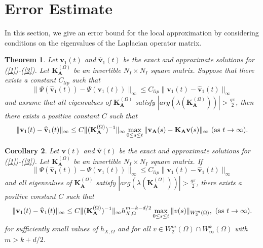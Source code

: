 \documentclass[9pt]{article}
\newtheorem{theorem}{Theorem}[section]
\newtheorem{corollary}[theorem]{Corollary}
\numberwithin{equation}{section}
\begin{document}
\section{Error Estimate}\label{Sec3}
In this section, we give an error
bound  for the local approximation by considering conditions
on the eigenvalues of the Laplacian operator matrix.
\begin{theorem}\label{uyo0}
Let $\textbf{v}_1(t)$ and $\widehat{\textbf{v}}_1(t)$ be the exact and approximate solutions for (\ref{1})-(\ref{3}). Let $\textbf{K}^{(\Omega)}_{\mathbf{A}}$ be an invertible $N_{I}\times N_{I}$ square matrix. Suppose that there exists a constant $C_{lip}$ such that \[\|\Psi(\widehat{\textbf{v}}_1(t))-\Psi(\textbf{v}_1(t))\|_{\infty}\leq C_{lip} \|\textbf{v}_{1}(t)-\widehat{\textbf{v}}_1(t)\|_{\infty}\]
 and assume that all eigenvalues of $\textbf{K}^{(\Omega)}_{\mathbf{A}}$ satisfy
$|arg(\lambda(\textbf{K}^{(\Omega)}_{\mathbf{A}}))|>\frac{q \pi}{2}$,
 then there exists a positive constant $C$ such that
\begin{eqnarray}\label{ret11}
\|\textbf{v}_{1}(t)-\widehat{\textbf{v}}_1(t)\|_{\infty}\leq C  \|(\textbf{K}^{(\Omega)}_{\mathbf{A}})^{-1}\|_{\infty}\max_{0\leq s \leq t} \|\textbf{v}_{\mathbf{A}}(s)-\textbf{K}_{\mathbf{A}}\textbf{v}(s)\|_{\infty}~(\hbox{as} ~t \rightarrow \infty).
\end{eqnarray}
\end{theorem}
\begin{corollary}
Let $\textbf{v}(t)$ and $\widehat{\textbf{v}}(t)$ be the exact and approximate solutions for (\ref{1})-(\ref{3}). Let $\textbf{K}^{(\Omega)}_{\mathbf{A}}$ be an invertible $N_{I}\times N_{I}$ square matrix. If \[\|\Psi(\widehat{\textbf{v}}_1(t))-\Psi(\textbf{v}_1(t))\|_{\infty}\leq C_{lip} \|\textbf{v}_{1}(t)-\widehat{\textbf{v}}_1(t)\|_{\infty}\]
 and all eigenvalues of $\textbf{K}^{(\Omega)}_{\mathbf{A}}$ satisfy
$|arg(\lambda(\textbf{K}^{(\Omega)}_{\mathbf{A}}))|>\frac{q \pi}{2}$,
there exists a positive constant $C$ such that
\begin{eqnarray*}
\|\textbf{v}_{1}(t)-\widehat{\textbf{v}}_1(t)\|_{\infty}\leq C\|(\textbf{K}^{(\Omega)}_{\mathbf{A}})^{-1}\|_{\infty}h_{X,\Omega}^{m-k-d/2}\max_{0\leq s \leq t}\Vert v(s)\Vert _{ W_{2}^{m}(\Omega)}, ~(\hbox{as}~t \rightarrow \infty).
\end{eqnarray*}
for sufficiently small values of $h_{X,\Omega}$ and for all $v\in W_{2}^{m}(\Omega)\cap W_{\infty}^{k}(\Omega)$ with $m>k+d/2$.
\end{corollary}
\end{document}
